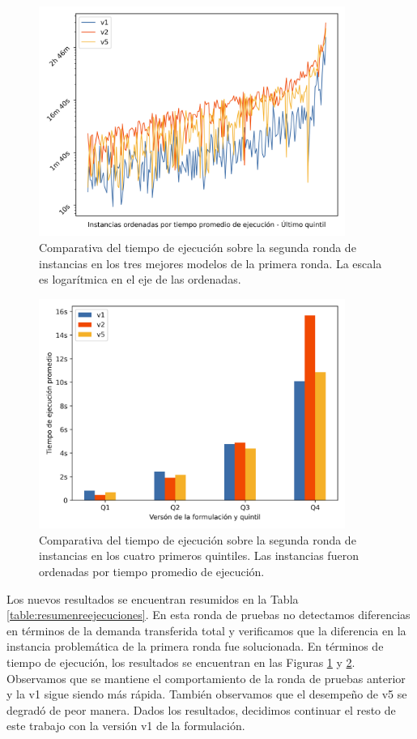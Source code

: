 \begin{figure}[h!]
  \centering
  \includegraphics[width=10cm]{../resources/run_time_comparsion_rerun.png}
  \caption{Comparativa del tiempo de ejecución sobre la segunda ronda de instancias en los tres mejores modelos de la primera ronda. La escala es logarítmica en el eje de las ordenadas.} \label{fig:runtimecomparisonrerun}
\end{figure}

\begin{figure}[h!]
  \centering
  \includegraphics[width=10cm]{../resources/run_time_comparsion_by_quintile_rerun.png}
  \caption{Comparativa del tiempo de ejecución sobre la segunda ronda de instancias en los cuatro primeros quintiles. Las instancias fueron ordenadas por tiempo promedio de ejecución.} \label{fig:firstfourquintilesrerun}
\end{figure}

Los nuevos resultados se encuentran resumidos en la Tabla \ref{table:resumenreejecuciones}. En esta ronda de pruebas no detectamos diferencias en términos de la demanda transferida total y verificamos que la diferencia en la instancia problemática de la primera ronda fue solucionada. En términos de tiempo de ejecución, los resultados se encuentran en las Figuras \ref{fig:runtimecomparisonrerun} y \ref{fig:firstfourquintilesrerun}. Observamos que se mantiene el comportamiento de la ronda de pruebas anterior y la v1 sigue siendo más rápida. También observamos que el desempeño de v5 se degradó de peor manera. Dados los resultados, decidimos continuar el resto de este trabajo con la versión v1 de la formulación.
